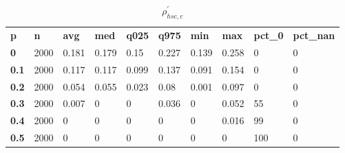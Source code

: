 \begin{table}[h]
 \centering 
\footnotesize
\caption{$\rho_{hsc,c}^\prime $}
\label{tab:alphahscc}
\begin{tabular}[h]{| l l l l l l l l l l|
    } \hline
\textbf{ p} & \textbf{ n} & \textbf{ avg} & \textbf{ med} & \textbf{ q025} & \textbf{ q975} & \textbf{ min} & \textbf{ max} & \textbf{ pct\_0} & \textbf{ pct\_nan}
           \\
  \textbf{  0} & 2000 & 0.181 & 0.179 &  0.15 & 0.227 & 0.139 & 0.258 &   0 & 0
           \\
  \textbf{0.1} & 2000 & 0.117 & 0.117 & 0.099 & 0.137 & 0.091 & 0.154 &   0 & 0
           \\
  \textbf{0.2} & 2000 & 0.054 & 0.055 & 0.023 &  0.08 & 0.001 & 0.097 &   0 & 0
           \\
  \textbf{0.3} & 2000 & 0.007 &     0 &     0 & 0.036 &     0 & 0.052 &  55 & 0
           \\
  \textbf{0.4} & 2000 &     0 &     0 &     0 &     0 &     0 & 0.016 &  99 & 0
           \\
  \textbf{0.5} & 2000 &     0 &     0 &     0 &     0 &     0 &     0 & 100 & 0
           \\
 \hline \end{tabular}
 \end{table}
